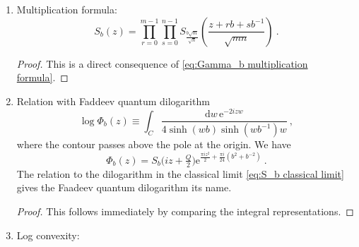 \documentclass[12pt,a4paper]{article}
\newcommand{\be}{\begin{equation}}
\newcommand{\ee}{\end{equation}}
\newcommand\RR{\mathbb{R}}
\let\Im\relax
\DeclareMathOperator\Im{Im}
\begin{document}
\begin{enumerate}
\begin{proof}
\begin{align}
   \frac{\hat{S}_b(z+b^{-1})}{\hat{S}_b(z)}&= \exp\left(\int_{\frac{2\pi i z}{b}+\RR_{\ge 0}} \frac{\mathrm{d}t}{1-\mathrm{e}^t}-\frac{\pi i}{2}+\pi i b^{-1}z \right) \\
    &=2 \sin(\pi b^{-1} z)
\end{align}
as desired. We also have to check the functional equation in $z \to z+b$. We note that the replacement $z \to z+b $ can be compensated by shifting the contour in $t$ downward, which picks up the pole at $t=0$. Thus we have
\begin{align}
    \frac{\hat{S}_b(z+b)}{\hat{S}_b(z)}&=\exp\left(-\log(1-\mathrm{e}^{-2\pi i b z})-\frac{\pi i}{2}+\pi i b z\right) \\
    &=2 \sin(\pi b z)\ .
\end{align}
It remains to compute the normalization constant. For this, we compute the asymptotics as $\Im(z) \to -\infty$ and compare with the known asymptotics of $S_b(z)$ of eq.~\eqref{eq:S_b asymptotics}. We have trivially for $b>0$
\be 
\Im(z) \to -\infty:\qquad \hat{S}_b(z)\to \mathrm{e}^{\frac{\pi i}{2}(z^2-Qz+\frac{1}{6}(Q^2+1))}\ .
\ee
Comparing with \eqref{eq:S_b asymptotics}, we conclude that the normalizations agree and hence $S_b(z)=\hat{S}_b(z)$.
    \end{proof}
    \item Multiplication formula:
    \be 
		S_b(z)=  \prod_{r=0}^{m-1} \prod_{s=0}^{n-1} S_{\frac{b \sqrt{m}}{\sqrt{n}}}\left(\frac{z+r b+s b^{-1}}{\sqrt{mn}} \right)  \ .\label{eq:S_b multiplication formula}
    \ee
    \begin{proof}
    This is a direct consequence of \eqref{eq:Gamma_b multiplication formula}.
    \end{proof}
    \item Relation with Faddeev quantum dilogarithm \cite{Faddeev:1995nb}
    \be 
        \log \Phi_b(z) \equiv \int_C \frac{\mathrm{d}w\, \mathrm{e}^{-2izw}}{4 \sinh(wb) \sinh(w b^{-1}) w}\ ,
    \ee
    where the contour passes above the pole at the origin. We have
    \be 
        \Phi_b(z)=S_b\big(iz+\tfrac{Q}{2}\big)\mathrm{e}^{\frac{\pi i z^2}{2}+\frac{\pi i}{24}(b^2+b^{-2})}\ .
    \ee
    The relation to the dilogarithm in the classical limit \eqref{eq:S_b classical limit} gives the Faadeev quantum dilogarithm its name.
    \begin{proof}
        This follows immediately by comparing the integral representations.
    \end{proof}
    \item Log convexity:

\end{enumerate}
\end{document}
